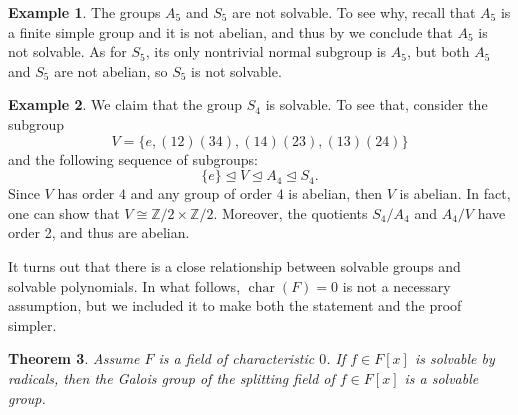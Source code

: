 \documentclass[12pt]{report}
\newtheorem{theorem}{Theorem}[chapter]
\numberwithin{equation}{section}
\numberwithin{theorem}{chapter}
\theoremstyle{definition}
\newtheorem{example}[theorem]{Example}
\newtheorem*{basic properties}{Basic Properties}
\newtheorem*{Important Remark}{Important Remark}
\newcommand{\Z}{\mathbb{Z}}
\DeclareMathOperator{\ch}{char}
\def\nsg{\unlhd}
\begin{document}
\begin{example}
The groups $A_5$ and $S_5$ are not solvable. To see why, recall that $A_5$ is a finite simple group and it is not abelian, and thus by  we conclude that $A_5$ is not solvable. As for $S_5$, its only nontrivial normal subgroup is $A_5$, but both $A_5$ and $S_5$ are not abelian, so $S_5$ is not solvable.
\end{example}


\begin{example}
We claim that the group $S_4$ is solvable. To see that, consider the subgroup
$$V=\{e,(12)(34),(14)(23),(13)(24)\}$$
and the following sequence of subgroups:
$$\{e\}\nsg V\nsg A_4\nsg S_4.$$
Since $V$ has order $4$ and any group of order $4$ is abelian, then $V$ is abelian. In fact, one can show that $V \cong \Z/2 \times \Z/2$. Moreover, the quotients $S_4/A_4$ and $A_4/V$ have order 2, and thus are abelian.
\end{example}



It turns out that there is a close relationship between solvable groups and solvable polynomials. In what follows, $\ch(F) = 0$ is not a necessary assumption, but we included it to make both the statement and the proof simpler.

\begin{theorem}\label{solvable by radicals implies solvable}
Assume $F$ is a field of characteristic $0$. If $f \in F[x]$ is solvable by radicals, then the Galois group of the splitting field of $f \in F[x]$ is a solvable group.
\end{theorem}
\end{document}
